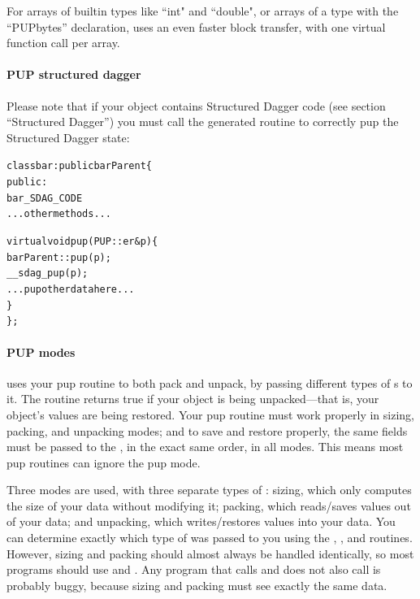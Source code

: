 For arrays of builtin types like ``int" and ``double", or arrays of a type 
with the ``PUPbytes'' declaration,  uses an even faster block 
transfer, with one virtual function call per array.


\paragraph{PUP structured dagger}
\label{sec:pupsdag}

Please note that if your object contains Structured Dagger code (see section ``Structured Dagger'') you must call the generated routine  to correctly pup the Structured Dagger state:

\begin{alltt}
class bar : public barParent \{
 public:
    bar_SDAG_CODE 
    ...other methods...

    virtual void pup(PUP::er& p) \{
      barParent::pup(p);
      __sdag_pup(p);
      ...pup other data here...
    \}
\};
\end{alltt}



\paragraph{PUP modes}
\label{sec:pupmodes}

\charmpp{} uses your pup routine to both pack and unpack, 
by passing different types of s to it.  The routine
 returns true if your object is being unpacked---that 
is, your object's values are being restored.  Your pup routine must
work properly in sizing, packing, and unpacking modes; and
to save and restore properly, the same fields must be passed 
to the , in the exact same order, in all modes.
This means most pup routines can ignore the pup mode.

Three modes are used, with three separate types of : 
sizing, which only computes the size of your data without modifying it;
packing, which reads/saves values out of your data; and unpacking,
which writes/restores values into your data.  You can determine
exactly which type of  was passed to you using the
, , and 
routines. However, sizing and packing should almost always be 
handled identically, so most programs should use 
and .  Any program that calls  
and does not also call  is probably buggy, because
sizing and packing must see exactly the same data.


